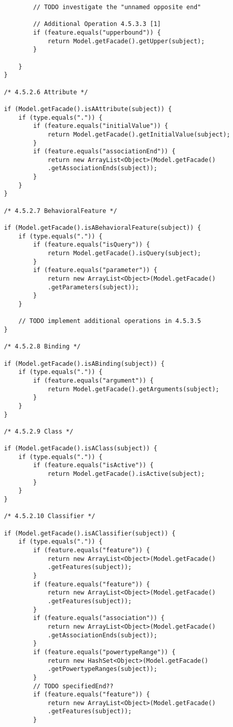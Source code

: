 \begin{mdframed}
\begin{lstlisting}
			// TODO investigate the "unnamed opposite end"
			
			// Additional Operation 4.5.3.3 [1]
			if (feature.equals("upperbound")) {
				return Model.getFacade().getUpper(subject);
			}
			
		}
	}
	
	/* 4.5.2.6 Attribute */  
	
	if (Model.getFacade().isAAttribute(subject)) {
		if (type.equals(".")) {
			if (feature.equals("initialValue")) {
				return Model.getFacade().getInitialValue(subject);
			}
			if (feature.equals("associationEnd")) {
				return new ArrayList<Object>(Model.getFacade()
				.getAssociationEnds(subject));
			}
		}
	}
	
	/* 4.5.2.7 BehavioralFeature */  
	
	if (Model.getFacade().isABehavioralFeature(subject)) {
		if (type.equals(".")) {
			if (feature.equals("isQuery")) {
				return Model.getFacade().isQuery(subject);
			}
			if (feature.equals("parameter")) {
				return new ArrayList<Object>(Model.getFacade()
				.getParameters(subject));
			}
		}
		
		// TODO implement additional operations in 4.5.3.5
	}
	
	/* 4.5.2.8 Binding */  
	
	if (Model.getFacade().isABinding(subject)) {
		if (type.equals(".")) {
			if (feature.equals("argument")) {
				return Model.getFacade().getArguments(subject);
			}
		}
	}        
	
	/* 4.5.2.9 Class */  
	
	if (Model.getFacade().isAClass(subject)) {
		if (type.equals(".")) {
			if (feature.equals("isActive")) {
				return Model.getFacade().isActive(subject);
			}
		}
	}        
	
	/* 4.5.2.10 Classifier */  
	
	if (Model.getFacade().isAClassifier(subject)) {
		if (type.equals(".")) {
			if (feature.equals("feature")) {
				return new ArrayList<Object>(Model.getFacade()
				.getFeatures(subject));
			}
			if (feature.equals("feature")) {
				return new ArrayList<Object>(Model.getFacade()
				.getFeatures(subject));
			}
			if (feature.equals("association")) {
				return new ArrayList<Object>(Model.getFacade()
				.getAssociationEnds(subject));
			}                
			if (feature.equals("powertypeRange")) {
				return new HashSet<Object>(Model.getFacade()
				.getPowertypeRanges(subject));
			}
			// TODO specifiedEnd??
			if (feature.equals("feature")) {
				return new ArrayList<Object>(Model.getFacade()
				.getFeatures(subject));
			}
			

\end{lstlisting}
\end{mdframed}

